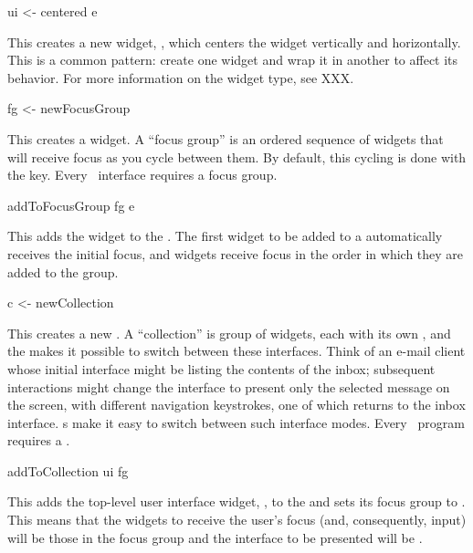 \begin{haskellcode}
 ui <- centered e
\end{haskellcode}

This creates a new  widget, , which centers the
 widget vertically and horizontally.  This is a common
pattern: create one widget and wrap it in another to affect its
behavior.  For more information on the  widget type, see
XXX.

\begin{haskellcode}
 fg <- newFocusGroup
\end{haskellcode}

This creates a  widget.  A ``focus group'' is an
ordered sequence of widgets that will receive focus as you cycle
between them.  By default, this cycling is done with the  key.
Every \vtyui\ interface requires a focus group.

\begin{haskellcode}
 addToFocusGroup fg e
\end{haskellcode}

This adds the  widget to the .  The first
widget to be added to a  automatically receives the
initial focus, and widgets receive focus in the order in which they
are added to the group.

\begin{haskellcode}
 c <- newCollection
\end{haskellcode}

This creates a new .  A ``collection'' is group of
widgets, each with its own , and the 
makes it possible to switch between these interfaces.  Think of an
e-mail client whose initial interface might be listing the contents of
the inbox; subsequent interactions might change the interface to
present only the selected message on the screen, with different
navigation keystrokes, one of which returns to the inbox interface.
s make it easy to switch between such interface modes.
Every \vtyui\ program requires a .

\begin{haskellcode}
 addToCollection ui fg
\end{haskellcode}

This adds the top-level user interface widget, , to the
 and sets its focus group to .  This means that
the widgets to receive the user’s focus (and, consequently, input)
will be those in the focus group  and the interface to be
presented will be .


